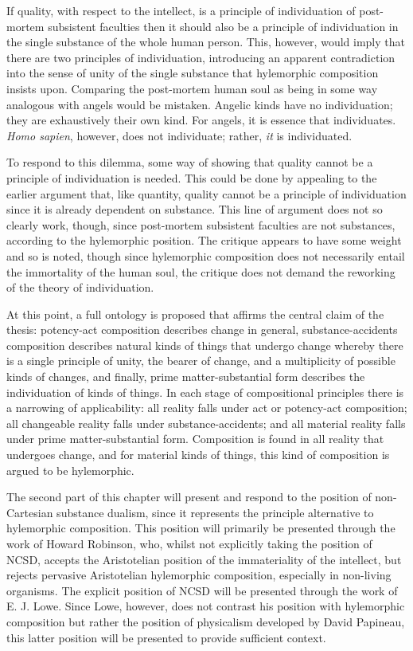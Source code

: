 If quality, with respect to the intellect, is a principle of individuation of post-mortem subsistent faculties then it should also be a principle of individuation in the single substance of the whole human person. This, however, would imply that there are two principles of individuation, introducing an apparent contradiction into the sense of unity of the single substance that hylemorphic composition insists upon. Comparing the post-mortem human soul as being in some way analogous with angels would be mistaken. Angelic kinds have no individuation; they are exhaustively their own kind. For angels, it is essence that individuates. \emph{Homo sapien}, however, does not individuate; rather, \emph{it} is individuated.

To respond to this dilemma, some way of showing that quality cannot be a principle of individuation is needed. This could be done by appealing to the earlier argument that, like quantity, quality cannot be a principle of individuation since it is already dependent on substance. This line of argument does not so clearly work, though, since post-mortem subsistent faculties are not substances, according to the hylemorphic position. The critique appears to have some weight and so is noted, though since hylemorphic composition does not necessarily entail the immortality of the human soul, the critique does not demand the reworking of the theory of individuation.

At this point, a full ontology is proposed that affirms the central claim of the thesis: potency-act composition describes change in general, substance-accidents composition describes natural kinds of things that undergo change whereby there is a single principle of unity, the bearer of change, and a multiplicity of possible kinds of changes, and finally, prime matter-substantial form describes the individuation of kinds of things. In each stage of compositional principles there is a narrowing of applicability: all reality falls under act or potency-act composition; all changeable reality falls under substance-accidents; and all material reality falls under prime matter-substantial form. Composition is found in all reality that undergoes change, and for material kinds of things, this kind of composition is argued to be hylemorphic.

The second part of this chapter will present and respond to the position of non-Cartesian substance dualism, since it represents the principle alternative to hylemorphic composition. This position will primarily be presented through the work of Howard Robinson, who, whilst not explicitly taking the position of NCSD, accepts the Aristotelian position of the immateriality of the intellect, but rejects pervasive Aristotelian hylemorphic composition, especially in non-living organisms. The explicit position of NCSD will be presented through the work of E. J. Lowe. Since Lowe, however, does not contrast his position with hylemorphic composition but rather the position of physicalism developed by David Papineau, this latter position will be presented to provide sufficient context.


